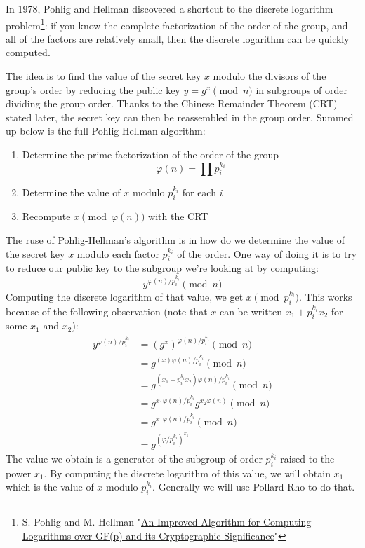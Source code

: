 \documentclass[a4paper,11pt,twocolumn]{article}
\begin{document}
In 1978, Pohlig and Hellman discovered a shortcut to the discrete logarithm problem\footnote{S. Pohlig and M. Hellman "\href{http://www-ee.stanford.edu/~hellman/publications/28.pdf}{An Improved Algorithm for Computing Logarithms over GF(p) and its Cryptographic Significance}"}\cite{PH}: if you know the complete factorization of the order of the group, and all of the factors are relatively small, then the discrete logarithm can be quickly computed.

The idea is to find the value of the secret key $x$ modulo the divisors of the group's order by reducing the public key $y = g^x \pmod{n}$ in subgroups of order dividing the group order. Thanks to the Chinese Remainder Theorem (CRT) stated later, the secret key can then be reassembled in the group order. Summed up below is the full Pohlig-Hellman algorithm:

\begin{enumerate}
    \item Determine the prime factorization of the order of the group
        $$\varphi(n) = \prod p_i^{k_i} $$
    \item Determine the value of $x$ modulo $p_i^{k_i}$ for each $i$
    \item Recompute $x \pmod{\varphi(n)}$ with the CRT
\end{enumerate}

The ruse of Pohlig-Hellman's algorithm is in how do we determine the value of the secret key $x$ modulo each factor $p_i^{k_i}$ of the order. One way of doing it is to try to reduce our public key to the subgroup we're looking at by computing:
$$y^{\varphi(n)/p_i^{k_i}} \pmod{n}$$
Computing the discrete logarithm of that value, we get $x \pmod{p_i^{k_i}}$. This works because of the following observation (note that $x$ can be written $x_1 + p_i^{k_i} x_2$ for some $x_1$ and $x_2$):
\begin{align*}
    y^{\varphi(n)/p_i^{k_i}} &= (g^{x})^{\varphi(n)/p_i^{k_i}} \pmod{n}\\
    &= g^{(x) \varphi(n)/p_i^{k_i}} \pmod{n}\\
    &= g^{(x_1 + p_i^{k_i} x_2) \varphi(n)/p_i^{k_i}} \pmod{n}\\
    &= g^{x_1 \varphi(n)/p_i^{k_i}} g^{x_2 \varphi(n)} \pmod{n}\\
    &= g^{x_1 \varphi(n)/p_i^{k_i}} \pmod{n}\\
    &= g^{(\varphi/p_i^{k_i})^{x_1}}
\end{align*}
The value we obtain is a generator of the subgroup of order $p_i^{k_i}$ raised to the power $x_1$. By computing the discrete logarithm of this value, we will obtain $x_1$ which is the value of $x$ modulo $p_i^{k_i}$. Generally we will use Pollard Rho to do that.\\
\end{document}
